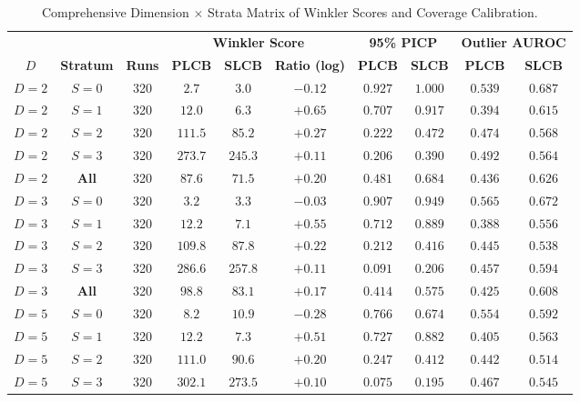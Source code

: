 \begin{table}[htbp]
\centering
\caption{Comprehensive Dimension $\times$ Strata Matrix of Winkler Scores and Coverage Calibration.}
\label{tab:dimension_strata_matrix}
\scriptsize
\begin{tabular}{cc c ccc cc cc}
\toprule
 & & & \multicolumn{3}{c}{\textbf{Winkler Score}} & \multicolumn{2}{c}{\textbf{95\% PICP}} & \multicolumn{2}{c}{\textbf{Outlier AUROC}} \\
\cmidrule(lr){4-6} \cmidrule(lr){7-8} \cmidrule(lr){9-10}
\textbf{$D$} & \textbf{Stratum} & \textbf{Runs} & \textbf{PLCB} & \textbf{SLCB} & \textbf{Ratio (log)} & \textbf{PLCB} & \textbf{SLCB} & \textbf{PLCB} & \textbf{SLCB} \\
\midrule
$D=2$ & $S=0$ & 320 & $2.7$ & $3.0$ & $-0.12$ & $0.927$ & $1.000$ & $0.539$ & $0.687$ \\
$D=2$ & $S=1$ & 320 & $12.0$ & $6.3$ & $+0.65$ & $0.707$ & $0.917$ & $0.394$ & $0.615$ \\
$D=2$ & $S=2$ & 320 & $111.5$ & $85.2$ & $+0.27$ & $0.222$ & $0.472$ & $0.474$ & $0.568$ \\
$D=2$ & $S=3$ & 320 & $273.7$ & $245.3$ & $+0.11$ & $0.206$ & $0.390$ & $0.492$ & $0.564$ \\
$D=2$ & \textbf{All} & 320 & $87.6$ & $71.5$ & $+0.20$ & $0.481$ & $0.684$ & $0.436$ & $0.626$ \\
$D=3$ & $S=0$ & 320 & $3.2$ & $3.3$ & $-0.03$ & $0.907$ & $0.949$ & $0.565$ & $0.672$ \\
$D=3$ & $S=1$ & 320 & $12.2$ & $7.1$ & $+0.55$ & $0.712$ & $0.889$ & $0.388$ & $0.556$ \\
$D=3$ & $S=2$ & 320 & $109.8$ & $87.8$ & $+0.22$ & $0.212$ & $0.416$ & $0.445$ & $0.538$ \\
$D=3$ & $S=3$ & 320 & $286.6$ & $257.8$ & $+0.11$ & $0.091$ & $0.206$ & $0.457$ & $0.594$ \\
$D=3$ & \textbf{All} & 320 & $98.8$ & $83.1$ & $+0.17$ & $0.414$ & $0.575$ & $0.425$ & $0.608$ \\
$D=5$ & $S=0$ & 320 & $8.2$ & $10.9$ & $-0.28$ & $0.766$ & $0.674$ & $0.554$ & $0.592$ \\
$D=5$ & $S=1$ & 320 & $12.2$ & $7.3$ & $+0.51$ & $0.727$ & $0.882$ & $0.405$ & $0.563$ \\
$D=5$ & $S=2$ & 320 & $111.0$ & $90.6$ & $+0.20$ & $0.247$ & $0.412$ & $0.442$ & $0.514$ \\
$D=5$ & $S=3$ & 320 & $302.1$ & $273.5$ & $+0.10$ & $0.075$ & $0.195$ & $0.467$ & $0.545$ \\

\end{tabular}
\end{table}
